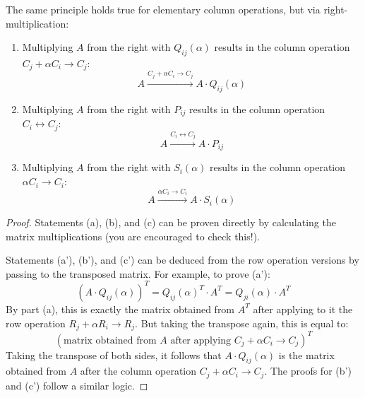 \begin{importantremark}
The same principle holds true for elementary column operations, but via right-multiplication:
\begin{enumerate}
    \item[\textbf{(a')}] Multiplying $A$ from the right with $Q_{ij}(\alpha)$ results in the column operation $C_j + \alpha C_i \longrightarrow C_j$:
    \begin{equation*}
        A \xrightarrow{C_j + \alpha C_i \longrightarrow C_j} A \cdot Q_{ij}(\alpha)
    \end{equation*}
    \item[\textbf{(b')}] Multiplying $A$ from the right with $P_{ij}$ results in the column operation $C_i \leftrightarrow C_j$:
    \begin{equation*}
        A \xrightarrow{C_i \leftrightarrow C_j} A \cdot P_{ij}
    \end{equation*}
    \item[\textbf{(c')}] Multiplying $A$ from the right with $S_i(\alpha)$ results in the column operation $\alpha C_i \longrightarrow C_i$:
    \begin{equation*}
        A \xrightarrow{\alpha C_i \longrightarrow C_i} A \cdot S_i(\alpha)
    \end{equation*}
\end{enumerate}
\end{importantremark}

\begin{proof}
Statements (a), (b), and (c) can be proven directly by calculating the matrix multiplications (you are encouraged to check this!). 

Statements (a'), (b'), and (c') can be deduced from the row operation versions by passing to the transposed matrix. For example, to prove (a'):
\begin{equation*}
    (A \cdot Q_{ij}(\alpha))^T = Q_{ij}(\alpha)^T \cdot A^T = Q_{ji}(\alpha) \cdot A^T
\end{equation*}
By part (a), this is exactly the matrix obtained from $A^T$ after applying to it the row operation $R_j + \alpha R_i \longrightarrow R_j$. But taking the transpose again, this is equal to:
\begin{equation*}
    \left( \text{matrix obtained from } A \text{ after applying } C_j + \alpha C_i \longrightarrow C_j \right)^T
\end{equation*}
Taking the transpose of both sides, it follows that $A \cdot Q_{ij}(\alpha)$ is the matrix obtained from $A$ after the column operation $C_j + \alpha C_i \longrightarrow C_j$. The proofs for (b') and (c') follow a similar logic.
\end{proof}

